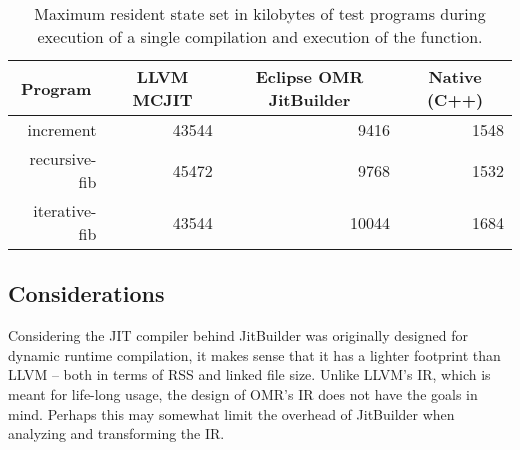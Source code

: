 \begin{table*}[t]
  \begin{tabular}{|r|l|l|l|} 
  \hline
  \multicolumn{1}{|c|}{\textbf{Program}}
  & \multicolumn{1}{c|}{\textbf{LLVM MCJIT}}                      & \multicolumn{1}{c|}{\textbf{Eclipse OMR JitBuilder}}
  & \multicolumn{1}{c|}{\textbf{Native (C++)}}                    \\ \hline

  increment                               
  & \multicolumn{1}{r|}{\num{43544}} %
  & \multicolumn{1}{r|}{\num{9416}} %
  & \multicolumn{1}{r|}{\num{1548}}    %
  \\ \hline
  
  recursive-fib                           
  & \multicolumn{1}{r|}{\num{45472}} %
  & \multicolumn{1}{r|}{\num{9768}} %
  & \multicolumn{1}{r|}{\num{1532}}   %
  \\ \hline
  
  iterative-fib                           
  & \multicolumn{1}{r|}{\num{43544}} %
  & \multicolumn{1}{r|}{\num{10044}} %
  & \multicolumn{1}{r|}{\num{1684}}   %
  \\ \hline
  
\end{tabular}
  \caption{Maximum resident state set in kilobytes of test programs during execution of a single compilation and execution of the function.}
  \label{tab:size_in_bytes}
\end{table*}


\subsection{Considerations}
Considering the JIT compiler behind JitBuilder was originally designed for dynamic runtime compilation, it makes sense that it has a lighter footprint than LLVM -- both in terms of RSS and linked file size.
Unlike LLVM's IR, which is meant for life-long usage, the design of OMR's IR does not have the goals in mind.
Perhaps this may somewhat limit the overhead of JitBuilder when analyzing and transforming the IR.
